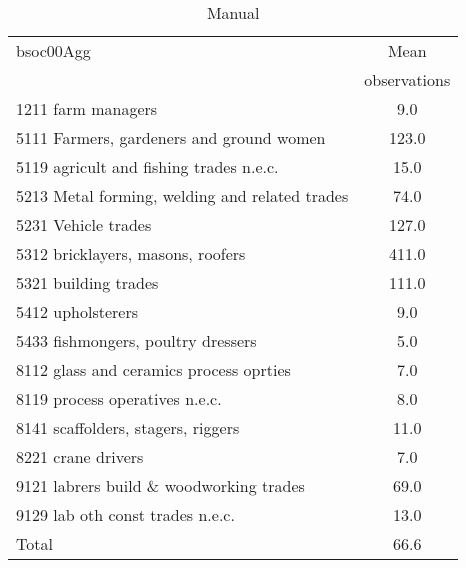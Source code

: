\begin{table}
	\centering
	\caption{Manual}
	\begin{tabular}{lc}
	\toprule	
		
bsoc00Agg&Mean \\
&observations \\
\hline
1211 farm managers&9.0 \\
5111 Farmers, gardeners and ground women&123.0 \\
5119 agricult and fishing trades n.e.c.&15.0 \\
5213 Metal forming, welding and related trades&74.0 \\
5231 Vehicle trades&127.0 \\
5312 bricklayers, masons, roofers&411.0 \\
5321 building trades&111.0 \\
5412 upholsterers&9.0 \\
5433 fishmongers, poultry dressers&5.0 \\
8112 glass and ceramics process oprties&7.0 \\
8119 process operatives n.e.c.&8.0 \\
8141 scaffolders, stagers, riggers&11.0 \\
8221 crane drivers&7.0 \\
9121 labrers build \& woodworking trades&69.0 \\
9129 lab oth const trades n.e.c.&13.0 \\
Total&66.6 \\
\bottomrule
\bottomrule
\end{tabular}
\end{table}
